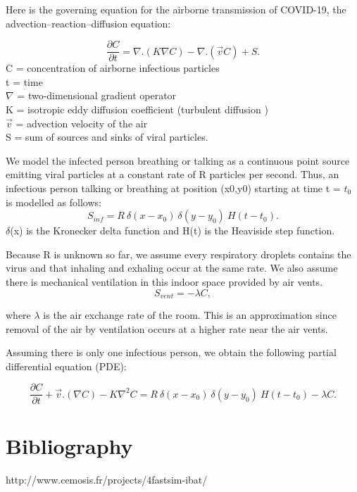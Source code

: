 \documentclass{article}
\begin{document}
Here is the governing equation for the airborne transmission of COVID-19, the advection–reaction–diffusion equation:

$$ \frac{\partial C}{\partial t} = \nabla . (K  \nabla  C) - \nabla . (\overrightarrow{v}  C) + S.$$
C = concentration of airborne infectious particles \\
t = time \\
$\nabla$ = two-dimensional gradient operator \\
K = isotropic eddy diffusion coefficient (turbulent diffusion ) \\
$\overrightarrow{v}$ = advection velocity of the air \\
S = sum of sources and sinks of viral particles.

We model the infected person breathing or talking as a continuous point source emitting viral particles at a constant rate of R particles per second. Thus, an infectious person talking or breathing at position (x0,y0) starting at time t = $t_0$ is modelled as follows:
$$ S_{inf} = R \ \delta(x-x_0) \ \delta(y-y_0) \ H(t-t_0). $$
$\delta$(x) is the Kronecker delta function and H(t) is the Heaviside step function.

Because R is unknown so far, we assume every respiratory droplets contains the virus and that inhaling and exhaling occur at the same rate.
We also assume there is mechanical ventilation in this indoor space provided by air vents.
$$S_{vent} = - \lambda C, $$

where $\lambda$ is the air exchange rate of the room. This is an approximation since removal of the air by ventilation occurs at a higher rate near the air vents.

Assuming there is only one infectious person, we obtain the following partial differential equation (PDE):

$$ \frac{\partial C}{\partial t} + \overrightarrow{v} . (\nabla C) - K  \nabla^2  C =
R \ \delta(x-x_0) \ \delta(y-y_0) \ H(t-t_0) - \lambda C.$$


\section*{Bibliography}
http://www.cemosis.fr/projects/4fastsim-ibat/
\end{document}
